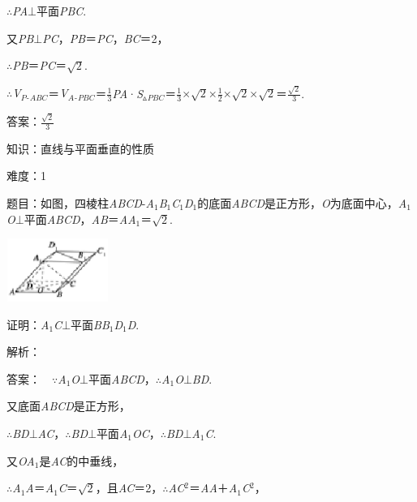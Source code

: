 \documentclass{article} %
\begin{document}
$\mathrm{\therefore}$\textit{PA}$\mathrm{\bot}$平面\textit{PBC}.

又\textit{PB}$\mathrm{\bot}$\textit{PC}，\textit{PB}＝\textit{PC}，\textit{BC}＝2，

$\mathrm{\therefore}$\textit{PB}＝\textit{PC}＝$\sqrt{2}$.

$\mathrm{\therefore}$\textit{V${}_{P}$}${}_{\textrm{-}}$\textit{${}_{ABC}$}＝\textit{V${}_{A}$}${}_{\textrm{-}}$\textit{${}_{PBC}$}＝$\frac{1}{3}$\textit{PA}·\textit{S}${}_{\vartriangle }$\textit{${}_{PBC}$}＝$\frac{1}{3}\mathrm{\times}$$\sqrt{2}\mathrm{\times}$$\frac{1}{2}\mathrm{\times}$$\sqrt{2}\mathrm{\times}\sqrt{2}$＝$\frac{\sqrt{2}}{3}$.

答案：$\frac{\sqrt{2}}{3}$


知识：直线与平面垂直的性质

难度：1

题目：如图，四棱柱\textit{ABCD}-\textit{A}${}_{1}$\textit{B}${}_{1}$\textit{C}${}_{1}$\textit{D}${}_{1}$的底面\textit{ABCD}是正方形，\textit{O}为底面中心，\textit{A}${}_{1}$\textit{O}$\mathrm{\bot}$平面\textit{ABCD}，\textit{AB}＝\textit{AA}${}_{1}$＝$\sqrt{2}$.

\includegraphics*[width=1.31in, height=0.81in, keepaspectratio=false]{image237}

证明：\textit{A}${}_{1}$\textit{C}$\mathrm{\bot}$平面\textit{BB}${}_{1}$\textit{D}${}_{1}$\textit{D}.

解析：

答案：　$\mathrm{\because}$\textit{A}${}_{1}$\textit{O}$\mathrm{\bot}$平面\textit{ABCD}，$\mathrm{\therefore}$\textit{A}${}_{1}$\textit{O}$\mathrm{\bot}$\textit{BD}.

又底面\textit{ABCD}是正方形，

$\mathrm{\therefore}$\textit{BD}$\mathrm{\bot}$\textit{AC}，$\mathrm{\therefore}$\textit{BD}$\mathrm{\bot}$平面\textit{A}${}_{1}$\textit{OC}，$\mathrm{\therefore}$\textit{BD}$\mathrm{\bot}$\textit{A}${}_{1}$\textit{C}.

又\textit{OA}${}_{1}$是\textit{AC}的中垂线，

$\mathrm{\therefore}$\textit{A}${}_{1}$\textit{A}＝\textit{A}${}_{1}$\textit{C}＝$\sqrt{2}$，且\textit{AC}＝2，$\mathrm{\therefore}$\textit{AC}${}^{2}$＝\textit{AA}＋\textit{A}${}_{1}$\textit{C}${}^{2}$，
\end{document}

